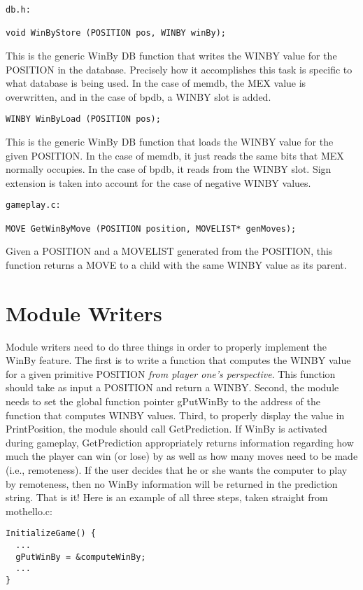 \documentclass[pdftex]{article}
\begin{document}
\begin{verbatim}
db.h:

void WinByStore (POSITION pos, WINBY winBy);
\end{verbatim}
This is the generic WinBy DB function that writes the WINBY value for the POSITION
in the database.  Precisely how it accomplishes this task is specific to what
database is being used.  In the case of memdb, the MEX value is overwritten, and in
the case of bpdb, a WINBY slot is added.

\begin{verbatim}
WINBY WinByLoad (POSITION pos);
\end{verbatim}
This is the generic WinBy DB function that loads the WINBY value for the given
POSITION.  In the case of memdb, it just reads the same bits that MEX normally
occupies.  In the case of bpdb, it reads from the WINBY slot.  Sign extension is
taken into account for the case of negative WINBY values.

\begin{verbatim}
gameplay.c:

MOVE GetWinByMove (POSITION position, MOVELIST* genMoves);
\end{verbatim}
Given a POSITION and a MOVELIST generated from the POSITION,
this function returns a MOVE to a child with the same WINBY value
as its parent.

\section{Module Writers}
\indent \indent Module writers need to do three things in order to properly implement
the WinBy feature.  The first is to write a function that computes the
WINBY value for a given primitive POSITION \emph{from player one's perspective}.  
This function should take as input a POSITION and return a WINBY.  Second, the module needs to set the
global function pointer gPutWinBy to the address of the function that computes
WINBY values.  Third, to properly display the value in PrintPosition, the module
should call GetPrediction.  If WinBy is activated during gameplay, GetPrediction
appropriately returns information regarding how much the player can win (or lose)
by as well as how many moves need to be made (i.e., remoteness).  If the user
decides that he or she wants the computer to play by remoteness, then no WinBy
information will be returned in the prediction string.  That is it!
Here is an example of all three steps, taken straight from mothello.c:
\begin{verbatim}
InitializeGame() {
  ...
  gPutWinBy = &computeWinBy;
  ...
}
\end{verbatim}
\end{document}
